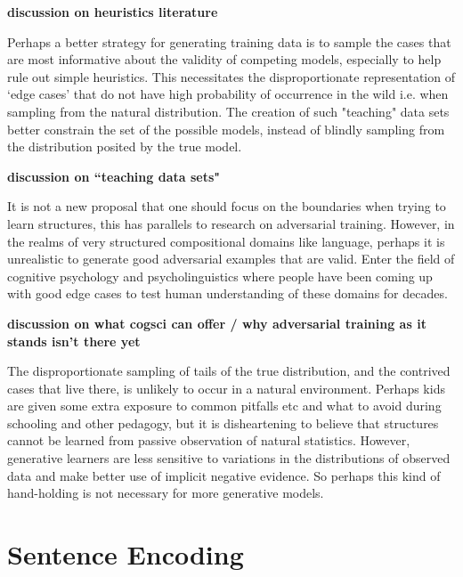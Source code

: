 \documentclass[10pt,letterpaper]{article}
\begin{document}
\textbf{discussion on heuristics literature}

Perhaps a better strategy for generating training data is to sample the cases that are most informative about the validity of competing models, especially to help rule out simple heuristics. This necessitates the disproportionate representation of `edge cases' that do not have high probability of occurrence in the wild i.e. when sampling from the natural distribution. The creation of such "teaching" data sets better constrain the set of the possible models, instead of blindly sampling from the distribution posited by the true model.

\textbf{discussion on ``teaching data sets"}

It is not a new proposal that one should focus on the boundaries when trying to learn structures, this has parallels to research on adversarial training. However, in the realms of very structured compositional domains like language, perhaps it is unrealistic to generate good adversarial examples that are valid. Enter the field of cognitive psychology and psycholinguistics where people have been coming up with good edge cases to test human understanding of these domains for decades. 

\textbf{discussion on what cogsci can offer / why adversarial training as it stands isn't there yet}

The disproportionate sampling of tails of the true distribution, and the contrived cases that live there, is unlikely to occur in a natural environment. Perhaps kids are given some extra exposure to common pitfalls etc and what to avoid during schooling and other pedagogy, but it is disheartening to believe that structures cannot be learned from passive observation of natural statistics. However, generative learners are less sensitive to variations in the distributions of observed data and make better use of implicit negative evidence. So perhaps this kind of hand-holding is not necessary for more generative models.


\section{Sentence Encoding}
\end{document}
